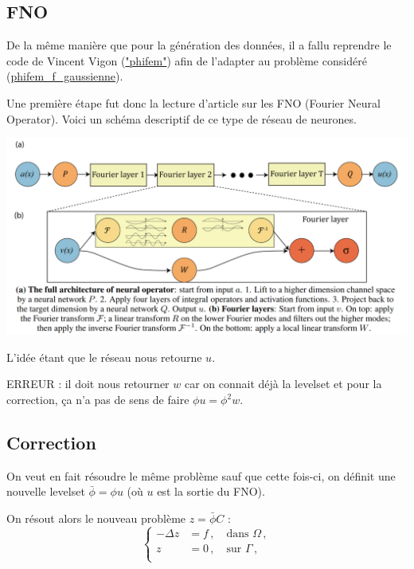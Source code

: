 \subsection{FNO}

De la même manière que pour la génération des données, il a fallu reprendre le code de Vincent Vigon (\href{https://colab.research.google.com/drive/1dOIb8N1i6FWXZPOvuP8xFIxmf0kjQysR}{"phifem"}) afin de l'adapter au problème considéré (\href{https://colab.research.google.com/drive/1-OdXA3xj5_X-xwvYplRStopU1yQe7AOg}{phifem\_f\_gaussienne}). 

Une première étape fut donc la lecture d'article sur les FNO (Fourier Neural Operator). Voici un schéma descriptif de ce type de réseau de neurones. 

\begin{minipage}{\linewidth}
	\centering
	\includegraphics[width=0.7\linewidth]{FNO.png}
\end{minipage}

L'idée étant que le réseau nous retourne $u$.

\begin{Rem}
	ERREUR : il doit nous retourner $w$ car on connait déjà la levelset et pour la correction, ça n'a pas de sens de faire $\phi u=\phi^2 w$.
\end{Rem}

\subsection{Correction}

On veut en fait résoudre le même problème sauf que cette fois-ci, on définit une nouvelle levelset $\bar{\phi}=\phi u$ (où $u$ est la sortie du FNO).

On résout alors le nouveau problème $z=\bar{\phi}C$ :
\begin{equation*}
	\begin{cases}
		-\Delta z &= f\,, \quad \text{dans $\Omega$}\,, \\
		z &= 0\,, \quad \text{sur $\Gamma$}\,, \\
	\end{cases}
\end{equation*}

